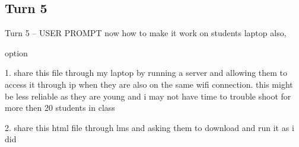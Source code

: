 \documentclass[10pt,a4paper]{article}
\begin{document}
\subsection*{Turn 5}
\begin{userbox}{Turn 5 -- USER PROMPT}
now how to make it work on students laptop also,

option

1. share this file through my laptop by running a server and allowing them to access it through ip when they are also on the same wifi connection. this might be less reliable as they are young and i may not have time to trouble shoot for more then 20 students in class

2. share this html file through lms and asking them to download and run it as i did
\end{userbox}
\end{document}
